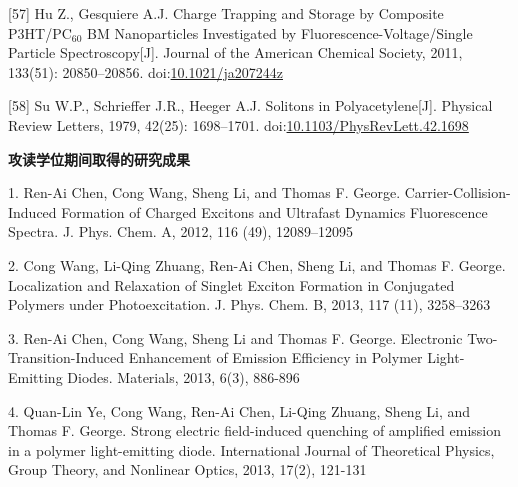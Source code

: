 \documentclass[12pt,]{report}
\begin{document}
{[}57{]} Hu Z., Gesquiere A.J. Charge Trapping and Storage by Composite
P3HT/PC\(_{\textrm{60}}\) BM Nanoparticles Investigated by
Fluorescence-Voltage/Single Particle Spectroscopy{[}J{]}. Journal of the
American Chemical Society, 2011, 133(51): 20850--20856.
doi:\href{http://dx.doi.org/10.1021/ja207244z}{10.1021/ja207244z}

{[}58{]} Su W.P., Schrieffer J.R., Heeger A.J. Solitons in
Polyacetylene{[}J{]}. Physical Review Letters, 1979, 42(25): 1698--1701.
doi:\href{http://dx.doi.org/10.1103/PhysRevLett.42.1698}{10.1103/PhysRevLett.42.1698}



\setlength\parindent{2em}
\clearpage
\clearpage\pagestyle{empty}\mbox{}\clearpage
\vspace*{0.0cm}

\begin{center}
\Large \textbf{攻读学位期间取得的研究成果}
\end{center}\vspace{0.54cm}

\pagestyle{plain}

\vspace{1.5cm}


1.	Ren-Ai Chen, Cong Wang, Sheng Li, and Thomas F. George. Carrier-Collision-Induced Formation of Charged Excitons and Ultrafast Dynamics Fluorescence Spectra. J. Phys. Chem. A, 2012, 116 (49), 12089–12095

2.	Cong Wang, Li-Qing Zhuang, Ren-Ai Chen, Sheng Li, and Thomas F. George. Localization and Relaxation of Singlet Exciton Formation in Conjugated Polymers under Photoexcitation. J. Phys. Chem. B, 2013, 117 (11), 3258–3263

3.	Ren-Ai Chen, Cong Wang, Sheng Li and Thomas F. George. Electronic Two-Transition-Induced Enhancement of Emission Efficiency in Polymer Light-Emitting Diodes. Materials, 2013, 6(3), 886-896

4.	Quan-Lin Ye, Cong Wang, Ren-Ai Chen, Li-Qing Zhuang, Sheng Li, and Thomas F. George. Strong electric field-induced quenching of amplified emission in a polymer light-emitting diode. International Journal of Theoretical Physics, Group Theory, and Nonlinear Optics, 2013, 17(2), 121-131
\end{document}
